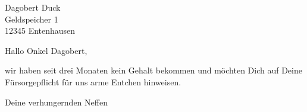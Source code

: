 \documentclass[12pt,ngerman]{scrlttr2}
\begin{document}
\begin{letter}{Dagobert Duck \\ Geldspeicher 1 \\ 12345 Entenhausen}




\opening{Hallo Onkel Dagobert,}

wir haben seit drei Monaten kein Gehalt bekommen und möchten Dich auf Deine Fürsorgepflicht für uns arme Entchen hinweisen.

\closing{Deine verhungernden Neffen}

\end{letter}
\end{document}
